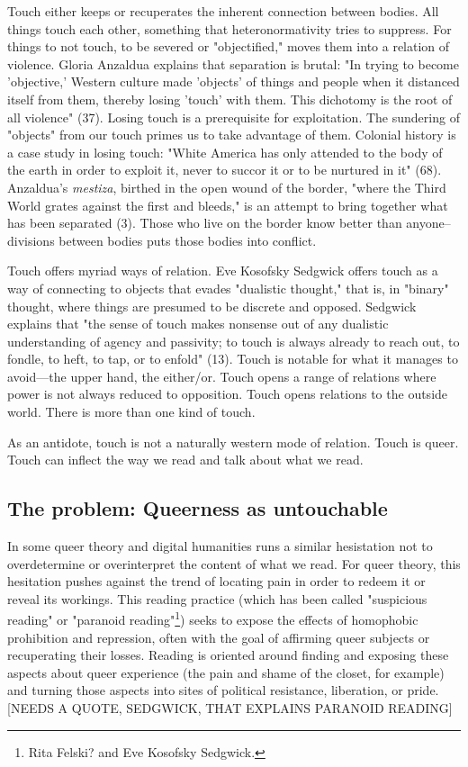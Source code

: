 \documentclass[11pt]{article}
\begin{document}
Touch either keeps or recuperates the inherent connection between
bodies. All things touch each other, something that heteronormativity
tries to suppress. For things to not touch, to be severed or
"objectified," moves them into a relation of violence. Gloria Anzaldua
explains that separation is brutal: "In trying to become 'objective,'
Western culture made 'objects' of things and people when it distanced
itself from them, thereby losing 'touch' with them. This dichotomy is
the root of all violence" (37). Losing touch is a prerequisite for
exploitation. The sundering of "objects" from our touch primes us to
take advantage of them. Colonial history is a case study in losing
touch: "White America has only attended to the body of the earth in
order to exploit it, never to succor it or to be nurtured in it"
(68). Anzaldua's \emph{mestiza}, birthed in the open wound of the border,
"where the Third World grates against the first and bleeds," is an
attempt to bring together what has been separated (3). Those who live
on the border know better than anyone--divisions between bodies puts
those bodies into conflict.

Touch offers myriad ways of relation. Eve Kosofsky Sedgwick offers
touch as a way of connecting to objects that evades "dualistic
thought," that is, in "binary" thought, where things are presumed to
be discrete and opposed. Sedgwick explains that "the sense of touch
makes nonsense out of any dualistic understanding of agency and
passivity; to touch is always already to reach out, to fondle, to
heft, to tap, or to enfold" (13). Touch is notable for what it manages
to avoid---the upper hand, the either/or. Touch opens a range of
relations where power is not always reduced to opposition. Touch opens
relations to the outside world. There is more than one kind of touch.

As an antidote, touch is not a naturally western mode of
relation. Touch is queer. Touch can inflect the way we read and talk
about what we read.


\subsection{The problem: Queerness as untouchable}
\label{sec:org9bb7448}
In some queer theory and digital humanities runs a similar hesistation
not to overdetermine or overinterpret the content of what we read. For
queer theory, this hesitation pushes against the trend of locating
pain in order to redeem it or reveal its workings. This reading
practice (which has been called "suspicious reading" or "paranoid
reading"\footnote{Rita Felski? and Eve Kosofsky Sedgwick.}) seeks to expose the effects of homophobic prohibition
and repression, often with the goal of affirming queer subjects or
recuperating their losses. Reading is oriented around finding and
exposing these aspects about queer experience (the pain and shame of
the closet, for example) and turning those aspects into sites of
political resistance, liberation, or pride. [NEEDS A QUOTE, SEDGWICK,
THAT EXPLAINS PARANOID READING]
\end{document}

